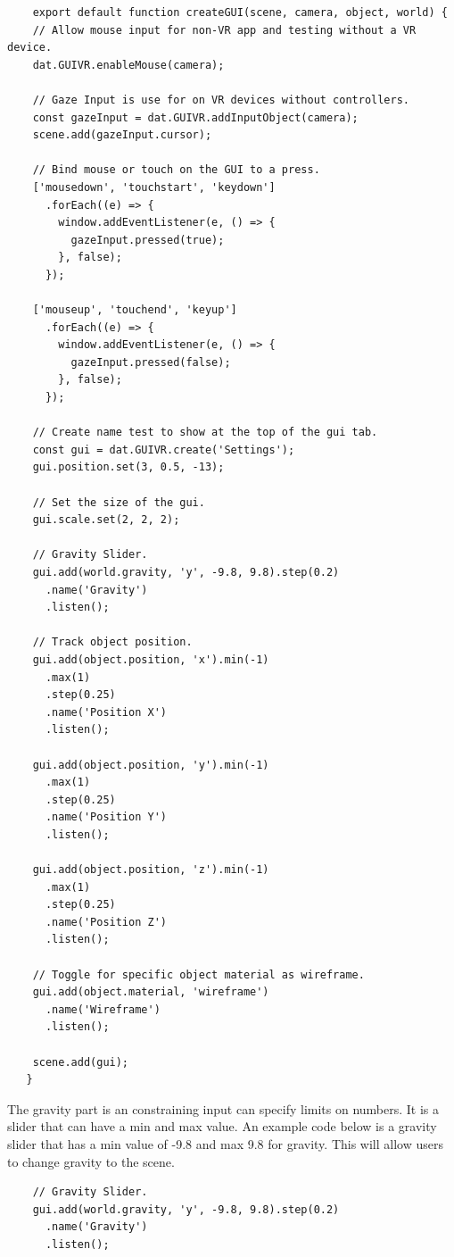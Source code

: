 \documentclass[onecolumn, draftclsnofoot,10pt, compsoc]{IEEEtran}
\begin{document}
    \begin{lstlisting}
    export default function createGUI(scene, camera, object, world) {
    // Allow mouse input for non-VR app and testing without a VR device.
    dat.GUIVR.enableMouse(camera);

    // Gaze Input is use for on VR devices without controllers.
    const gazeInput = dat.GUIVR.addInputObject(camera);
    scene.add(gazeInput.cursor);

    // Bind mouse or touch on the GUI to a press.
    ['mousedown', 'touchstart', 'keydown']
      .forEach((e) => {
        window.addEventListener(e, () => {
          gazeInput.pressed(true);
        }, false);
      });

    ['mouseup', 'touchend', 'keyup']
      .forEach((e) => {
        window.addEventListener(e, () => {
          gazeInput.pressed(false);
        }, false);
      });

    // Create name test to show at the top of the gui tab.
    const gui = dat.GUIVR.create('Settings');
    gui.position.set(3, 0.5, -13);

    // Set the size of the gui.
    gui.scale.set(2, 2, 2);

    // Gravity Slider.
    gui.add(world.gravity, 'y', -9.8, 9.8).step(0.2)
      .name('Gravity')
      .listen();

    // Track object position.
    gui.add(object.position, 'x').min(-1)
      .max(1)
      .step(0.25)
      .name('Position X')
      .listen();

    gui.add(object.position, 'y').min(-1)
      .max(1)
      .step(0.25)
      .name('Position Y')
      .listen();

    gui.add(object.position, 'z').min(-1)
      .max(1)
      .step(0.25)
      .name('Position Z')
      .listen();

    // Toggle for specific object material as wireframe.
    gui.add(object.material, 'wireframe')
      .name('Wireframe')
      .listen();

    scene.add(gui);
   }
   \end{lstlisting} 
    

    \newpage
    The gravity part is an constraining input can specify limits on numbers. It is a slider that can have a min and max value. An example code below is a gravity slider that has a min value of -9.8 and max 9.8 for gravity. This will allow users to change gravity to the scene.
    
   \begin{lstlisting}
    // Gravity Slider.
    gui.add(world.gravity, 'y', -9.8, 9.8).step(0.2)
      .name('Gravity')
      .listen();
   \end{lstlisting}
 
\end{document}
